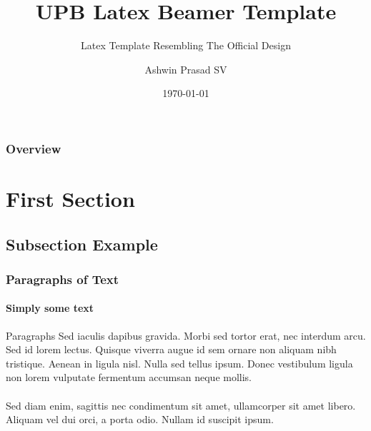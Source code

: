 \documentclass[aspectratio=169]{beamer}
\title{UPB Latex Beamer Template}
\subtitle{Latex Template Resembling The Official Design}
\author{Ashwin Prasad SV}
\institute{Institution name}
\date{\today}
\begin{document}
	
{
	\hnititlebackground 
	\begin{frame}
		\titlepage %
	\end{frame}
}

{
	\begin{frame}
		\frametitle{Overview} %
		\tableofcontents %
	\end{frame}
}


	
\section{First Section} %

\subsection{Subsection Example} %

\begin{frame}
	\frametitle{Paragraphs of Text}
	\framesubtitle{Simply some text}
	
	Paragraphs Sed iaculis dapibus gravida. Morbi sed tortor erat, nec interdum arcu. Sed id lorem lectus. Quisque viverra augue id sem ornare non aliquam nibh tristique. Aenean in ligula nisl. Nulla sed tellus ipsum. Donec vestibulum ligula non lorem vulputate fermentum accumsan neque mollis.\\~\\
	
	Sed diam enim, sagittis nec condimentum sit amet, ullamcorper sit amet libero. Aliquam vel dui orci, a porta odio. Nullam id suscipit ipsum. 
\end{frame}
\end{document}
